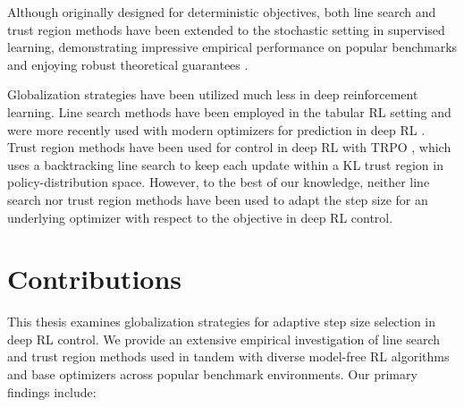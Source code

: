 Although originally designed for deterministic objectives, both line search and trust region methods have been extended to the stochastic setting in supervised learning, demonstrating impressive empirical performance on popular benchmarks and enjoying robust theoretical guarantees \cite{lu2024towards,vaswani2019painless,galli2023monotone,shea2024so,vaswani2020adaptive,fox2024glocal,vaswani2025armijo,fan2023bisls,jiang2023adaptive}.

Globalization strategies have been utilized much less in deep reinforcement learning. Line search methods have been employed in the tabular RL setting  and were more recently used with modern optimizers for prediction in deep RL \cite{PALS2026}. Trust region methods have been used for control in deep RL with TRPO \cite{schulman2015trust}, which uses a backtracking line search to keep each update within a KL trust region in policy-distribution space. However, to the best of our knowledge, neither line search nor trust region methods have been used to adapt the step size for an underlying optimizer with respect to the objective in deep RL control.

\section{Contributions}
This thesis examines globalization strategies for adaptive step size selection in deep RL control. We provide an extensive empirical investigation of line search and trust region methods used in tandem with diverse model-free RL algorithms and base optimizers across popular benchmark environments. Our primary findings include:


